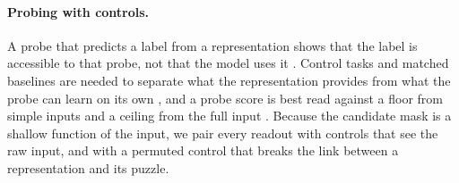 \paragraph{Probing with controls.} A probe that predicts a label from a representation shows that the label is accessible to that probe, not that the model uses it \citep{belinkov2022probing}. Control tasks and matched baselines are needed to separate what the representation provides from what the probe can learn on its own \citep{hewitt2019control}, and a probe score is best read against a floor from simple inputs and a ceiling from the full input \citep{garg2026floors}. Because the candidate mask is a shallow function of the input, we pair every readout with controls that see the raw input, and with a permuted control that breaks the link between a representation and its puzzle.
